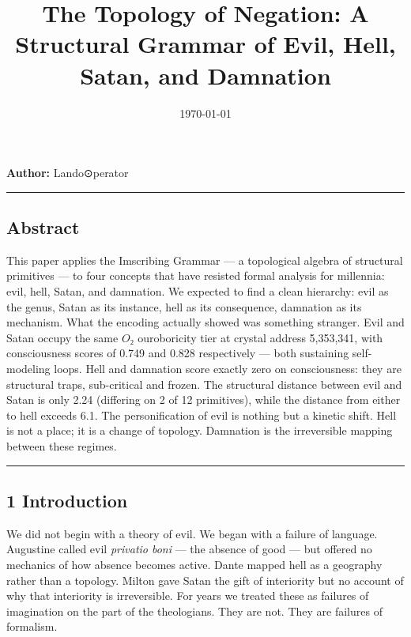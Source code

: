 \documentclass[12pt,a4paper]{article}
\begin{document}
\title{The Topology of Negation: A Structural Grammar of Evil, Hell, Satan, and Damnation}
\date{\today}

\maketitle

\textbf{Author:} Lando\otimes⊙perator

\begin{center}
\rule{0.5\textwidth}{0.4pt}
\end{center}

\subsection{Abstract}

This paper applies the Imscribing Grammar --- a topological algebra of structural primitives --- to four concepts that have resisted formal analysis for millennia: evil, hell, Satan, and damnation. We expected to find a clean hierarchy: evil as the genus, Satan as its instance, hell as its consequence, damnation as its mechanism. What the encoding actually showed was something stranger. Evil and Satan occupy the same $O₂$ ouroboricity tier at crystal address 5,353,341, with consciousness scores of 0.749 and 0.828 respectively --- both sustaining self-modeling loops. Hell and damnation score exactly zero on consciousness: they are structural traps, sub-critical and frozen. The structural distance between evil and Satan is only 2.24 (differing on 2 of 12 primitives), while the distance from either to hell exceeds 6.1. The personification of evil is nothing but a kinetic shift. Hell is not a place; it is a change of topology. Damnation is the irreversible mapping between these regimes.

\begin{center}
\rule{0.5\textwidth}{0.4pt}
\end{center}

\subsection{1 Introduction}

We did not begin with a theory of evil. We began with a failure of language. Augustine called evil \emph{privatio boni} --- the absence of good --- but offered no mechanics of how absence becomes active. Dante mapped hell as a geography rather than a topology. Milton gave Satan the gift of interiority but no account of why that interiority is irreversible. For years we treated these as failures of imagination on the part of the theologians. They are not. They are failures of formalism.
\end{document}
